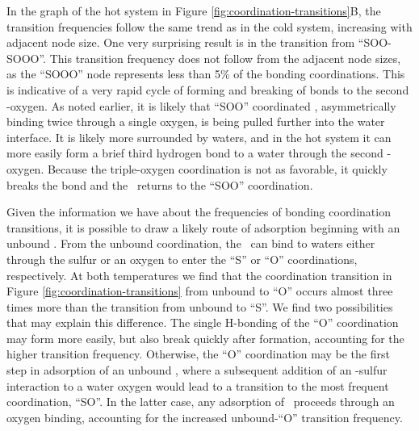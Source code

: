 \documentclass{article}
\begin{document}
In the graph of the hot system in Figure \ref{fig:coordination-transitions}B, the transition frequencies follow the same trend as in the cold system, increasing with adjacent node size. One very surprising result is in the transition from ``SOO-SOOO''. This transition frequency does not follow from the adjacent node sizes, as the ``SOOO'' node represents less than 5\% of the bonding coordinations. This is indicative of a very rapid cycle of forming and breaking of bonds to the second \suldiox-oxygen. As noted earlier, it is likely that ``SOO'' coordinated \suldiox, asymmetrically binding twice through a single oxygen, is being pulled further into the water interface. It is likely more surrounded by waters, and in the hot system it can more easily form a brief third hydrogen bond to a water through the second \suldiox-oxygen. Because the triple-oxygen coordination is not as favorable, it quickly breaks the bond and the \suldiox~returns to the ``SOO'' coordination.

Given the information we have about the frequencies of bonding coordination transitions, it is possible to draw a likely route of adsorption beginning with an unbound \suldiox. From the unbound coordination, the \suldiox~can bind to waters either through the sulfur or an oxygen to enter the ``S'' or ``O'' coordinations, respectively. At both temperatures we find that the coordination transition in Figure \ref{fig:coordination-transitions} from unbound to ``O'' occurs almost three times more than the transition from unbound to ``S''. We find two possibilities that may explain this difference. The single H-bonding of the ``O'' coordination may form more easily, but also break quickly after formation, accounting for the higher transition frequency. Otherwise, the ``O'' coordination may be the first step in adsorption of an unbound \suldiox, where a subsequent addition of an \suldiox-sulfur interaction to a water oxygen would lead to a transition to the most frequent coordination, ``SO''. In the latter case, any adsorption of \suldiox~proceeds through an oxygen binding, accounting for the increased unbound-``O'' transition frequency.
\end{document}
